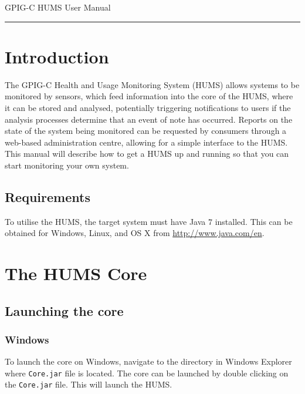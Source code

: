 \documentclass[10pt,a4paper]{article}
\begin{document}
\begin{center}
{\vspace*{-0.7cm}
\Huge GPIG-C HUMS User Manual}
\vspace*{0.3cm}

\end{center}
\vspace*{0.4cm}
\hrule
\vspace*{0.4cm}

\tableofcontents

\section{Introduction}

The GPIG-C Health and Usage Monitoring System (HUMS) allows systems to be monitored by sensors, which feed information into the core of the HUMS, where it can be stored and analysed, potentially triggering notifications to users if the analysis processes determine that an event of note has occurred. Reports on the state of the system being monitored can be requested by consumers through a web-based administration centre, allowing for a simple interface to the HUMS. This manual will describe how to get a HUMS up and running so that you can start monitoring your own system.

\subsection{Requirements}

To utilise the HUMS, the target system must have Java $7$ installed. This can be obtained for Windows, Linux, and OS X from \url{http://www.java.com/en}.

\section{The HUMS Core}
\label{sec:launching}

\subsection{Launching the core}
\subsubsection{Windows}
To launch the core on Windows, navigate to the directory in Windows Explorer where \texttt{Core.jar} file is located. The core can be launched by double clicking on the \texttt{Core.jar} file. This will launch the HUMS.
\end{document}
